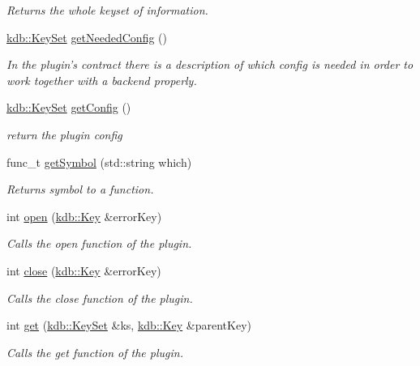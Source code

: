 \begin{DoxyCompactItemize}
\begin{DoxyCompactList}\small\item\em Returns the whole keyset of information. \end{DoxyCompactList}\item 
\hyperlink{classkdb_1_1KeySet}{kdb\+::\+Key\+Set} \hyperlink{classkdb_1_1tools_1_1Plugin_ad2a0a4a64d17c479e7cd8b1402275cc7}{get\+Needed\+Config} ()
\begin{DoxyCompactList}\small\item\em In the plugin's contract there is a description of which config is needed in order to work together with a backend properly. \end{DoxyCompactList}\item 
\hyperlink{classkdb_1_1KeySet}{kdb\+::\+Key\+Set} \hyperlink{classkdb_1_1tools_1_1Plugin_af3004444f5ef05dc8106646ff2b95694}{get\+Config} ()
\begin{DoxyCompactList}\small\item\em return the plugin config \end{DoxyCompactList}\item 
func\+\_\+t \hyperlink{classkdb_1_1tools_1_1Plugin_aca31140802ab463d5bddd95dee73194d}{get\+Symbol} (std\+::string which)
\begin{DoxyCompactList}\small\item\em Returns symbol to a function. \end{DoxyCompactList}\item 
int \hyperlink{classkdb_1_1tools_1_1Plugin_a680a490123b5290441d76ef2c1e3f1fa}{open} (\hyperlink{classkdb_1_1Key}{kdb\+::\+Key} \&error\+Key)
\begin{DoxyCompactList}\small\item\em Calls the open function of the plugin. \end{DoxyCompactList}\item 
int \hyperlink{classkdb_1_1tools_1_1Plugin_a40b5fd413f3f6da735680ed8d7c8a6a2}{close} (\hyperlink{classkdb_1_1Key}{kdb\+::\+Key} \&error\+Key)
\begin{DoxyCompactList}\small\item\em Calls the close function of the plugin. \end{DoxyCompactList}\item 
int \hyperlink{classkdb_1_1tools_1_1Plugin_a2aa6ff55f9cf81a59d2a8d271fe68e0f}{get} (\hyperlink{classkdb_1_1KeySet}{kdb\+::\+Key\+Set} \&ks, \hyperlink{classkdb_1_1Key}{kdb\+::\+Key} \&parent\+Key)
\begin{DoxyCompactList}\small\item\em Calls the get function of the plugin. \end{DoxyCompactList}\item 

\end{DoxyCompactItemize}
